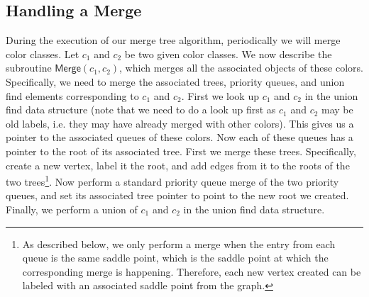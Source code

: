 \documentclass[A4paper,11pt]{article}
\newcommand{\Merge}{\mathsf{Merge}}
\begin{document}
\subsection{Handling a Merge}  
During the execution of our merge tree algorithm, periodically we will merge color classes.  Let $c_1$ and $c_2$ be two given color classes.  We now describe the subroutine $\Merge(c_1, c_2)$, which merges all the associated objects of these colors.  Specifically, we need to merge the associated trees, priority queues, and union find elements corresponding to $c_1$ and $c_2$.  First we look up $c_1$ and $c_2$ in the union find data structure (note that we need to do a look up first as $c_1$ and $c_2$ may be old labels, i.e. they may have already merged with other colors).  This gives us a pointer to the associated queues of these colors. 
Now each of these queues has a pointer to the root of its associated tree.  First we merge these trees.  Specifically, create a new vertex, label it the root, and add edges from it to the roots of the two trees\footnote{As described below, we only perform a merge when the entry from each queue is the same saddle point, which is the saddle point at which the corresponding merge is happening.  Therefore, each new vertex created can be labeled with an associated saddle point from the graph.}.  Now perform a standard priority queue merge of the two priority queues, and set its associated tree pointer to point to the new root we created.  Finally, we perform a union of $c_1$ and $c_2$ in the union find data structure.

\end{document}
